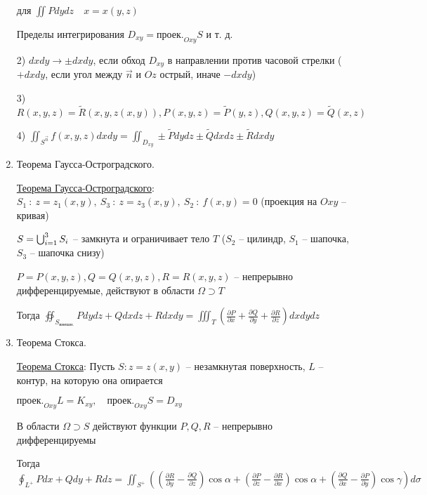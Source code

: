 \documentclass[12pt]{article}
\begin{document}
\begin{enumerate}
        для $\iint Pdydz \quad x = x(y, z)$

        Пределы интегрирования $D_{xy} = \text{проек.}_{Oxy} S$ и т. д.

        2) $dxdy \to \pm dxdy$, если обход $D_{xy}$ в направлении против часовой стрелки ($+dxdy$, если угол между $\overrightarrow{n}$ и $Oz$ острый, иначе $-dxdy$)

        3) $R(x, y, z) = \tilde{R}(x, y, z(x, y)), P(x, y, z) = \tilde{P}(y, z), Q(x, y, z) = \tilde{Q}(x, z)$

        4) $\iint_{S^{\overrightarrow{n}}} f(x, y, z) dxdy = \iint_{D_{xy}} \pm \tilde{P}dydz \pm \tilde{Q}dxdz \pm \tilde{R}dxdy$

        \item Теорема Гаусса-Остроградского.

        \hyperlink{theoremGaussOstrogradskyy}{Теорема Гаусса-Остроградского}:
        $S_1\ : \ z = z_1(x, y),\ S_3\ :\ z = z_3(x, y),\ S_2\ : \ f(x, y) = 0$ (проекция на $Oxy$ -- кривая)

        $S = \bigcup_{i = 1}^3 S_i$ -- замкнута и ограничивает тело $T$ ($S_2$ -- цилиндр, $S_1$ -- шапочка, $S_3$ -- шапочка снизу)

        $P = P(x, y, z), Q = Q(x, y, z), R = R(x, y, z)$ -- непрерывно дифференцируемые, действуют в области $\Omega \supset T$

        Тогда $\oiint_{S_{\text{внешн.}}} Pdydz + Qdxdz + Rdxdy = \iiint_T \left(\frac{\partial P}{\partial x} + \frac{\partial Q}{\partial y} + \frac{\partial R}{\partial z}\right) dxdydz$


        \item Теорема Стокса.

        \hyperlink{theoremStokes}{Теорема Стокса}: Пусть $S : z = z(x, y)$ -- незамкнутая поверхность, $L$ -- контур, на которую она опирается

        $\text{проек.}_{Oxy} L = K_{xy}, \quad \text{проек.}_{Oxy} S = D_{xy}$

        В области $\Omega \supset S$ действуют функции $P, Q, R$ -- непрерывно дифференцируемы

        Тогда $\oint_{L^+} Pdx + Qdy + Rdz = \iint_{S^+} \left(\left(\frac{\partial R}{\partial y} - \frac{\partial Q}{\partial z}\right)\cos\alpha +
        \left(\frac{\partial P}{\partial z} - \frac{\partial R}{\partial x}\right)\cos\alpha + \left(\frac{\partial Q}{\partial x} - \frac{\partial P}{\partial y}\right)\cos\gamma\right) d\sigma$



\end{enumerate}
\end{document}
